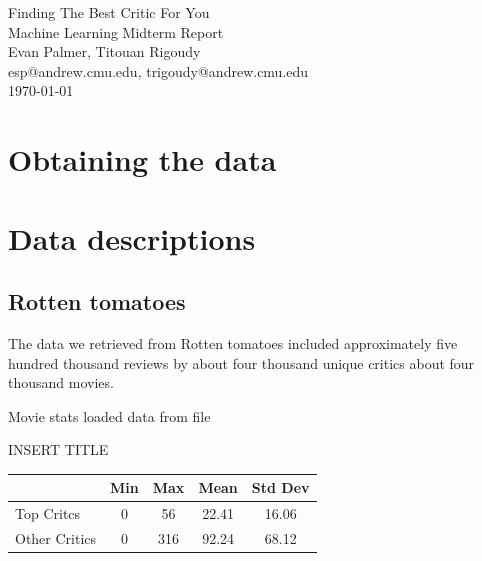 \documentclass[12pt]{article}
\makeatletter
\newcommand{\myname}{Evan Palmer, Titouan Rigoudy}
\newcommand{\myandrew}{esp@andrew.cmu.edu, trigoudy@andrew.cmu.edu}
\newcommand{\thedate}{\today}
\makeatother
\begin{document}
	\medskip    
	\thispagestyle{plain}
	\begin{center}                 
	{\LARGE Finding The Best Critic For You} \\
	\medskip
	Machine Learning Midterm Report \\
	\smallskip
	\myname \\
	\myandrew \\
	\thedate \\
	\end{center}
	\vspace{0.5cm}


\section{Obtaining the data}

\section{Data descriptions}

\subsection{Rotten tomatoes}

The data we retrieved from Rotten tomatoes included approximately five hundred thousand reviews by about four thousand unique critics about four thousand movies.

Movie stats
loaded data from file
\begin{table}[H]
 \centering
 INSERT TITLE \\
 \begin{tabular}{| l | c | c | c | c |}
 \hline
 &  Min & Max & Mean & Std Dev  \\
 \hline
 Top Critcs & 0 & 56 & 22.41 & 16.06 \\
 Other Critics & 0 & 316 & 92.24 & 68.12 \\
 \hline
 \end{tabular}
 \end{table}
\end{document}
